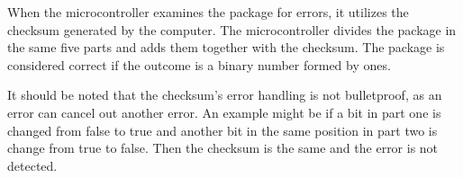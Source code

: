 When the microcontroller examines the package for errors, it utilizes the checksum generated by the computer. The microcontroller divides the package in the same five parts and adds them together with the checksum. The package is considered correct if the outcome is a binary number formed by ones.


It should be noted that the checksum's error handling is not bulletproof, as an error can cancel out another error. An example might be if a bit in part one is changed from false to true and another bit in the same position in part two is change from true to false. Then the checksum is the same and the error is not detected. \\


